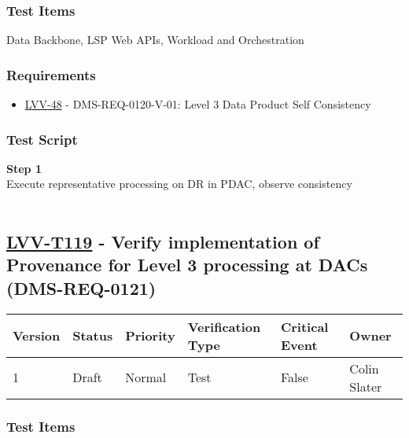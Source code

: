 \hypertarget{test-items-94}{%
\subsubsection{Test Items}\label{test-items-94}}

Data Backbone, LSP Web APIs, Workload and Orchestration~

\hypertarget{requirements-95}{%
\subsubsection{Requirements}\label{requirements-95}}

\begin{itemize}
\tightlist
\item
  \href{https://jira.lsstcorp.org/browse/LVV-48}{LVV-48} -
  DMS-REQ-0120-V-01: Level 3 Data Product Self Consistency
\end{itemize}

\hypertarget{test-script-95}{%
\subsubsection{Test Script}\label{test-script-95}}

\textbf{Step 1}\\
Execute representative processing on DR in PDAC, observe consistency\\
~\\

\hypertarget{lvv-t119---verify-implementation-of-provenance-for-level-3-processing-at-dacs-dms-req-0121}{%
\subsection{\texorpdfstring{\href{https://jira.lsstcorp.org/secure/Tests.jspa\#/testCase/LVV-T119}{LVV-T119}
- Verify implementation of Provenance for Level 3 processing at DACs
(DMS-REQ-0121)}{LVV-T119 - Verify implementation of Provenance for Level 3 processing at DACs (DMS-REQ-0121)}}\label{lvv-t119---verify-implementation-of-provenance-for-level-3-processing-at-dacs-dms-req-0121}}

\begin{longtable}[]{@{}llllll@{}}
\toprule
Version & Status & Priority & Verification Type & Critical Event &
Owner\tabularnewline
\midrule
\endhead
1 & Draft & Normal & Test & False & Colin Slater\tabularnewline
\bottomrule
\end{longtable}

\hypertarget{test-items-95}{%
\subsubsection{Test Items}\label{test-items-95}}

